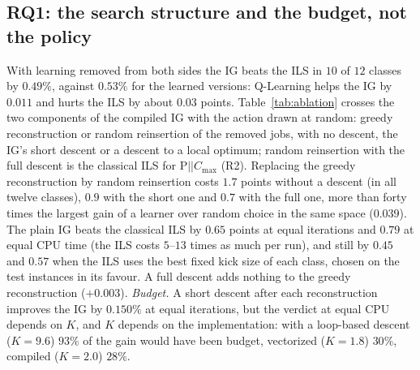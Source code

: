 \documentclass[conference,a4paper]{IEEEtran}
\newcommand{\Cmax}{C_{\max}}
\begin{document}
\subsection{RQ1: the search structure and the budget, not the policy}
\label{sec:rq1}
With learning removed from both sides the IG beats the ILS in $10$ of $12$ classes by $0.49\%$, against $0.53\%$ for the learned versions: Q-Learning helps the IG by $0.011$ and hurts the ILS by about $0.03$ points.
Table~\ref{tab:ablation} crosses the two components of the compiled IG with the action drawn at random: greedy reconstruction or random reinsertion of the removed jobs, with no descent, the IG's short descent or a descent to a local optimum; random reinsertion with the full descent is the classical ILS for P$||\Cmax$ (R2).
Replacing the greedy reconstruction by random reinsertion costs $1.7$ points without a descent (in all twelve classes), $0.9$ with the short one and $0.7$ with the full one, more than forty times the largest gain of a learner over random choice in the same space ($0.039$).
The plain IG beats the classical ILS by $0.65$ points at equal iterations and $0.79$ at equal CPU time (the ILS costs $5$--$13$ times as much per run), and still by $0.45$ and $0.57$ when the ILS uses the best fixed kick size of each class, chosen on the test instances in its favour.
A full descent adds nothing to the greedy reconstruction ($+0.003$).
\emph{Budget.} A short descent after each reconstruction improves the IG by $0.150\%$ at equal iterations, but the verdict at equal CPU depends on $K$, and $K$ depends on the implementation: with a loop-based descent ($K=9.6$) $93\%$ of the gain would have been budget, vectorized ($K=1.8$) $30\%$, compiled ($K=2.0$) $28\%$.


\end{document}
